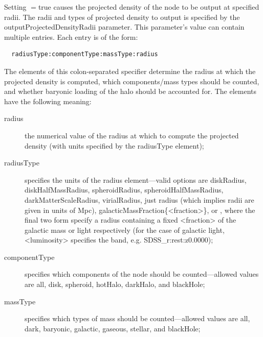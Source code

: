 Setting {\normalfont \ttfamily [outputProjectedDensityData]}$=${\normalfont \ttfamily true} causes the projected density of the node to be output at specified radii. The radii and types of projected density to output is specified by the {\normalfont \ttfamily outputProjectedDensityRadii} parameter. This parameter's value can contain multiple entries. Each entry is of the form:
\begin{verbatim}
  radiusType:componentType:massType:radius
\end{verbatim}
The elements of this colon-separated specifier determine the radius at which the projected density is computed, which components/mass types should be counted, and whether baryonic loading of the halo should be accounted for. The elements have the following meaning:
\begin{description}
 \item [{\normalfont \ttfamily radius}] the numerical value of the radius at which to compute the projected density (with units specified by the {\normalfont \ttfamily radiusType} element);
 \item [{\normalfont \ttfamily radiusType}] specifies the units of the {\normalfont \ttfamily radius} element---valid options are {\normalfont \ttfamily diskRadius}, {\normalfont \ttfamily diskHalfMassRadius}, {\normalfont \ttfamily spheroidRadius}, {\normalfont \ttfamily spheroidHalfMassRadius}, {\normalfont \ttfamily darkMatterScaleRadius}, {\normalfont \ttfamily virialRadius}, just {\normalfont \ttfamily radius} (which implies radii are given in units of Mpc), {\normalfont \ttfamily galacticMassFraction\{\textless fraction\textgreater\}}, or , where the final two form specify a radius containing a fixed {\normalfont \ttfamily \textless fraction\textgreater} of the galactic mass or light respectively (for the case of galactic light, {\normalfont \ttfamily \textless luminosity\textgreater} specifies the band, e.g. {\normalfont \ttfamily SDSS\_r:rest:z0.0000});
 \item [{\normalfont \ttfamily componentType}] specifies which components of the node should be counted---allowed values are {\normalfont \ttfamily all}, {\normalfont \ttfamily disk}, {\normalfont \ttfamily spheroid}, {\normalfont \ttfamily hotHalo}, {\normalfont \ttfamily darkHalo}, and {\normalfont \ttfamily blackHole};
 \item [{\normalfont \ttfamily massType}] specifies which types of mass should be counted---allowed values are {\normalfont \ttfamily all}, {\normalfont \ttfamily dark}, {\normalfont \ttfamily baryonic}, {\normalfont \ttfamily galactic}, {\normalfont \ttfamily gaseous}, {\normalfont \ttfamily stellar}, and {\normalfont \ttfamily blackHole};
\end{description}

